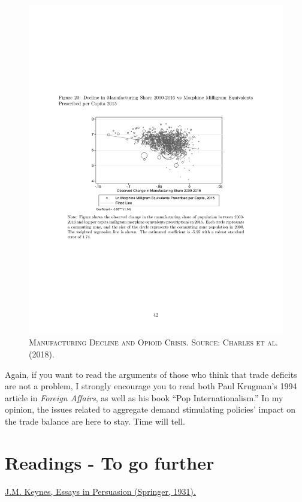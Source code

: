 \documentclass[]{book}
\begin{document}
\begin{figure}

{\centering \includegraphics[width=0.8\linewidth,height=0.8\textheight]{figures/CharlesHurstSchwartz2018/fig20} 

}

\caption{\textsc{Manufacturing Decline and
Opioid Crisis. Source: Charles et al. (2018).}}\label{fig:CharlesHurstSchwartz2018-fig20}
\end{figure}

Again, if you want to read the arguments of those who think that trade
deficits are not a problem, I strongly encourage you to read both Paul
Krugman's 1994 article in \emph{Foreign Affairs}, as well as his book
``Pop Internationalism.'' In my opinion, the issues related to aggregate
demand stimulating policies' impact on the trade balance are here to
stay. Time will tell.

\section*{Readings - To go further}\label{readings---to-go-further-14}

\href{https://en.wikisource.org/wiki/Essays_in_Persuasion}{J.M. Keynes,
Essays in Persuasion (Springer, 1931).}
\end{document}
